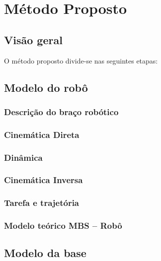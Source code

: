 \chapter{Método Proposto}



\section{Visão geral}

O método proposto divide-se nas seguintes etapas:



\section{Modelo do robô}

\subsection{Descrição do braço robótico}

\subsection{Cinemática Direta}

\subsection{Dinâmica}

\subsection{Cinemática Inversa}

\subsection{Tarefa e trajetória}

\subsection{Modelo teórico MBS -- Robô}


\section{Modelo da base}

